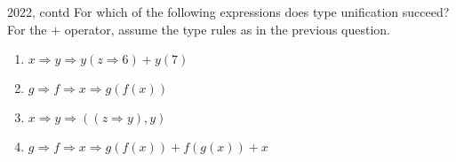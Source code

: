 
\begin{exercise}{2022, contd}
  For which of the following expressions does type unification succeed? For the
  \(+\) operator, assume the type rules as in the previous question.
  \begin{enumerate}
    \item \(x \Rightarrow y \Rightarrow y(z \Rightarrow 6) + y(7)\)
    \item \(g \Rightarrow f \Rightarrow x \Rightarrow g(f(x))\)
    \item \(x \Rightarrow y \Rightarrow ((z \Rightarrow y), y)\)
    \item \(g \Rightarrow f \Rightarrow x \Rightarrow g(f(x)) + f(g(x)) + x\)
  \end{enumerate}
\end{exercise}

